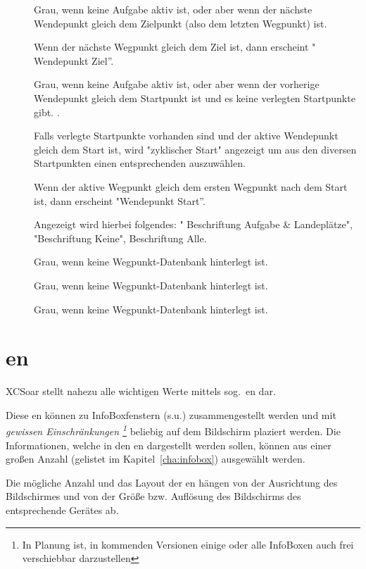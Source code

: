 \begin{description}
\item[]
  Grau, wenn keine  Aufgabe aktiv ist, oder aber wenn der nächste Wendepunkt gleich dem Zielpunkt (also dem letzten Wegpunkt) ist.

 Wenn der nächste Wegpunkt gleich dem Ziel ist, dann erscheint " Wendepunkt Ziel''.
\item[]
  Grau, wenn keine  Aufgabe aktiv ist, oder aber wenn der vorherige Wendepunkt gleich dem Startpunkt ist und es keine verlegten Startpunkte gibt. .

  Falls verlegte Startpunkte vorhanden sind und der aktive Wendepunkt gleich dem Start ist, wird "zyklischer Start" angezeigt um aus den diversen Startpunkten einen entsprechenden auszuwählen.

Wenn der aktive Wegpunkt gleich dem ersten Wegpunkt nach dem Start ist, dann erscheint  "Wendepunkt Start''.
\item[]
Angezeigt wird hierbei folgendes: " Beschriftung Aufgabe \& Landeplätze", "Beschriftung Keine", Beschriftung Alle.

\item[]
 Grau,  wenn keine Wegpunkt-Datenbank hinterlegt ist.
 \item[]
  Grau,  wenn keine Wegpunkt-Datenbank hinterlegt ist.
\item[]
  Grau,  wenn keine Wegpunkt-Datenbank hinterlegt ist.
\end{description}

\section{{\InfoBox}en}

\textsf{XCSoar} stellt nahezu alle wichtigen Werte mittels  sog.\  {\InfoBox}en dar. 


Diese {\InfoBox}en können zu InfoBoxfenstern (s.u.) zusammengestellt werden und mit
\emph{gewissen Einschränkungen \footnote{In Planung ist, in kommenden Versionen einige oder alle 
InfoBoxen auch frei verschiebbar darzustellen}} beliebig auf dem Bildschirm plaziert werden. 
Die Informationen, welche in den  {\InfoBox}en dargestellt werden sollen,  können aus einer großen Anzahl (gelistet im Kapitel~\ref{cha:infobox}) ausgewählt werden.

Die mögliche Anzahl und das Layout der {\InfoBox}en  hängen von der Ausrichtung des Bildschirmes und von der Größe bzw. Auflösung des Bildschirms des entsprechende Gerätes ab. 

